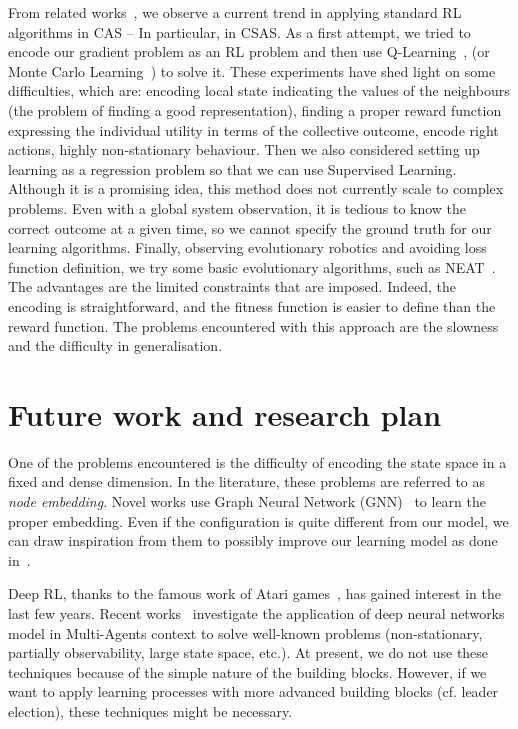 \documentclass[conference]{IEEEtran}
\begin{document}
From related works~\cite{DAngelo2019}, we observe a current trend in applying standard RL algorithms in CAS -- In particular, in CSAS.
%
As a first attempt, we tried to encode our gradient problem as an RL problem and then use Q-Learning~\cite{DBLP:journals/ras/Krose95}, (or Monte Carlo Learning~\cite{DBLP:conf/nips/Thrun99}) to solve it.
%
These experiments have shed light on some difficulties, which are: encoding local state indicating the values of the neighbours (the problem of finding a good representation), finding a proper reward function expressing the individual utility in terms of the collective outcome, encode right actions, highly non-stationary behaviour. 
%
Then we also considered setting up learning as a regression problem so that we can use Supervised Learning.
% 
Although it is a promising idea, this method does not currently scale to complex problems.
%
Even with a global system observation, it is tedious to know the correct outcome at a given time, so we cannot specify the ground truth for our learning algorithms.
%
Finally, observing evolutionary robotics and avoiding loss function definition, we try some basic evolutionary algorithms, such as NEAT~\cite{DBLP:journals/ec/StanleyM02}.
%
The advantages are the limited constraints that are imposed. Indeed, the encoding is straightforward, and the fitness function is easier to define than the reward function.
%
The problems encountered with this approach are the slowness and the difficulty in generalisation.
%
\section{Future work and research plan}
One of the problems encountered is the difficulty of encoding the state space in a fixed and dense dimension. 
%
In the literature, these problems are referred to as \emph{node embedding}. 
%
Novel works use Graph Neural Network (GNN)~\cite{DBLP:journals/tnn/ScarselliGTHM09} to learn the proper embedding.
%
Even if the configuration is quite different from our model, we can draw inspiration from them to possibly improve our learning model as done in~\cite{DBLP:conf/nips/SukhbaatarSF16}.

Deep RL, thanks to the famous work of Atari games~\cite{DBLP:journals/corr/HosuR16}, has gained interest in the last few years. 
%
Recent works~\cite{DBLP:journals/aamas/Hernandez-LealK19} investigate the application of deep neural networks model in Multi-Agents context to solve well-known problems (non-stationary, partially observability, large state space, etc.). 
%
At present, we do not use these techniques because of the simple nature of the building blocks. However, if we want to apply learning processes with more advanced building blocks (cf. leader election), these techniques might be necessary.
\end{document}
